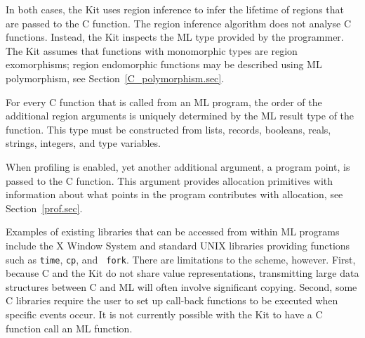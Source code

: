 \documentclass[12pt]{book}
\begin{document}
In both cases, the Kit uses region inference to infer the lifetime of
regions that are passed to the C function.  The region inference
algorithm does not analyse C functions. Instead, the Kit inspects the
ML type provided by the programmer. The Kit assumes that functions
with monomorphic types are 
%
region exomorphisms;
%
region endomorphic functions may be described using ML polymorphism,
see Section~\ref{C_polymorphism.sec}.

For every C function that is called from an ML program, the order of the
additional region arguments is uniquely determined by the ML result type
of the function.  This type must be constructed from lists, records,
booleans, reals, strings, integers, and type variables.

When profiling is enabled, yet another additional argument, a program
point, is passed to the C function. This argument provides allocation
primitives with information about what points in the program
contributes with allocation, see Section~\ref{prof.sec}.

Examples of existing libraries that can be accessed from within ML
programs include the X Window System and standard UNIX libraries
providing functions such as {\tt time}, {\tt cp}, and {\tt
fork}. There are limitations to the scheme, however. First, because C
and the Kit do not share value representations, transmitting large
data structures between C and ML will often involve significant
copying. Second, some C libraries require the user to set up
%
call-back functions to be executed when specific events occur. It is
not currently possible with the Kit to have a C function call an ML
function.

\end{document}
